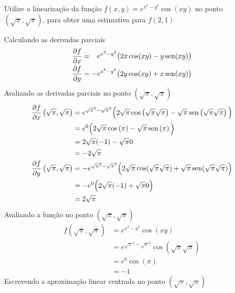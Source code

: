 \documentclass[a4paper,12pt,fleqn]{article}
\begin{document}

Utilize a linearização da função
\(
  f(x, y) = e^{x^2 - y^2} \cos(xy)
\)
no ponto \(\left(\sqrt{\pi}, \sqrt{\pi}\right)\),
para obter uma estimativa para \(f(2, 1)\)
\clearpagequestiononly

\begin{answer}
  Calculando as derivadas parciais
  \begin{align*}
    \D{f}{x} & = \hpm e^{x^2 - y^2} \big(2x \cos(xy) - y \sin(xy)\big) \\
    \D{f}{y} & =    - e^{x^2 - y^2} \big(2y \cos(xy) + x \sin(xy)\big)
  \end{align*}
  Avaliando as derivadas parciais no ponto \(\left(\sqrt{\pi}, \sqrt{\pi}\right)\)
  \begin{align*}
    \frac{\partial {f}}{\partial {x}}\left(\sqrt{\pi}, \sqrt{\pi}\right)
      & = e^{\sqrt{\pi}^2 - \sqrt{\pi}^2}
          \Big(2\sqrt{\pi} \cos\left(\sqrt{\pi}\sqrt{\pi}\right)
              - \sqrt{\pi} \operatorname{sen}\left(\sqrt{\pi}\sqrt{\pi}\right)\Big) \\
      & = e^{0}
          \Big(2\sqrt{\pi} \cos\left(\pi\right)
              - \sqrt{\pi} \operatorname{sen}\left(\pi\right)\Big) \\
      & = 2\sqrt{\pi} (-1) - \sqrt{\pi} 0 \\
      & = -2\sqrt{\pi} \\
    \frac{\partial {f}}{\partial {y}}\left(\sqrt{\pi}, \sqrt{\pi}\right)
      & = - e^{\sqrt{\pi}^2 - \sqrt{\pi}^2}
          \Big(2\sqrt{\pi} \cos(\sqrt{\pi}\sqrt{\pi})
              + \sqrt{\pi} \operatorname{sen}(\sqrt{\pi}\sqrt{\pi})\Big) \\
      & = - e^{0} \Big(2\sqrt{\pi} (-1) + \sqrt{\pi} 0\Big) \\
      & = 2\sqrt{\pi}
  \end{align*}
  Avaliando a função no ponto  \(\left(\sqrt{\pi}, \sqrt{\pi}\right)\)
  \begin{align*}
    f(\sqrt{\pi}, \sqrt{\pi})
      & = e^{x^2 - y^2} \cos(xy) \\
      & = e^{\sqrt{\pi}^2 - \sqrt{\pi}^2} \cos\left(\sqrt{\pi}\sqrt{\pi}\right) \\
      & = e^{0} \cos\left(\pi\right) \\
      & = -1
  \end{align*}
  Escrevendo a aproximação linear centrada no ponto  \(\left(\sqrt{\pi}, \sqrt{\pi}\right)\)
  \begin{align*}

\end{align*}
\end{answer}
\end{document}
